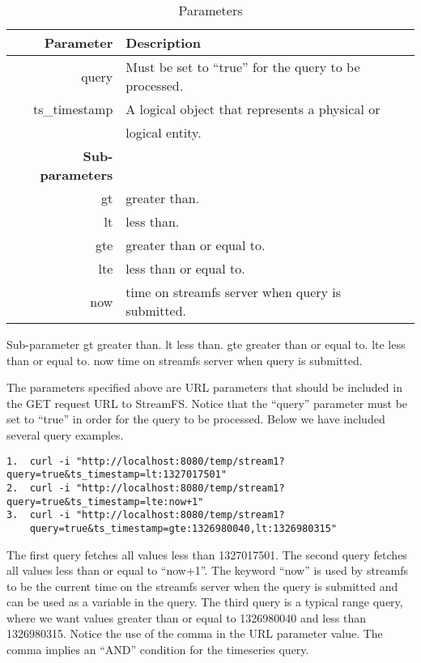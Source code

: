 \begin{table}[h]
\begin{center}
\begin{tabular}{| r | l | l |}
	\hline
	\textbf{Parameter} & \textbf{Description} \\ \hline


	query & Must be set to ``true'' for the query to be processed.  \\ \hline

	ts\_timestamp & A logical object that represents a physical or  \\
				  & logical entity. 							 	\\ \hline


	\textbf{Sub-parameters} & 										\\ \hline
	gt 			& greater than. 									\\ \hline
	lt		   	& less than.  										\\ \hline
	gte		   	& greater than or equal to. 						\\ \hline
	lte		   	& less than or equal to.							\\ \hline
	now		   	& time on streamfs server when query is submitted. 	\\ \hline

\end{tabular}
\caption{Parameters}
\label{tab:parameters}
\end{center}
\end{table}


Sub-parameter	
gt	 greater than.
lt	 less than.
gte	 greater than or equal to.
lte	 less than or equal to.
now	 time on streamfs server when query is submitted.

The parameters specified above are URL parameters that should be included in the GET request URL to StreamFS. Notice that the ``query'' parameter must be set to ``true'' in order for the query to be processed. Below we have included several query examples.

\begin{lstlisting}
1.  curl -i "http://localhost:8080/temp/stream1?query=true&ts_timestamp=lt:1327017501"
2.  curl -i "http://localhost:8080/temp/stream1?query=true&ts_timestamp=lte:now+1"
3.  curl -i "http://localhost:8080/temp/stream1?
    query=true&ts_timestamp=gte:1326980040,lt:1326980315"
\end{lstlisting}

The first query fetches all values less than 1327017501. The second query fetches all values less than or equal to ``now+1''. 
The keyword ``now'' is used by streamfs to be the current time on the streamfs server when the query is submitted and can be used 
as a variable in the query. The third query is a typical range query, where we want values greater than or equal to 
1326980040 and less than 1326980315. Notice the use of the comma in the URL parameter value. The comma implies an ``AND''
 condition for the timeseries query.

